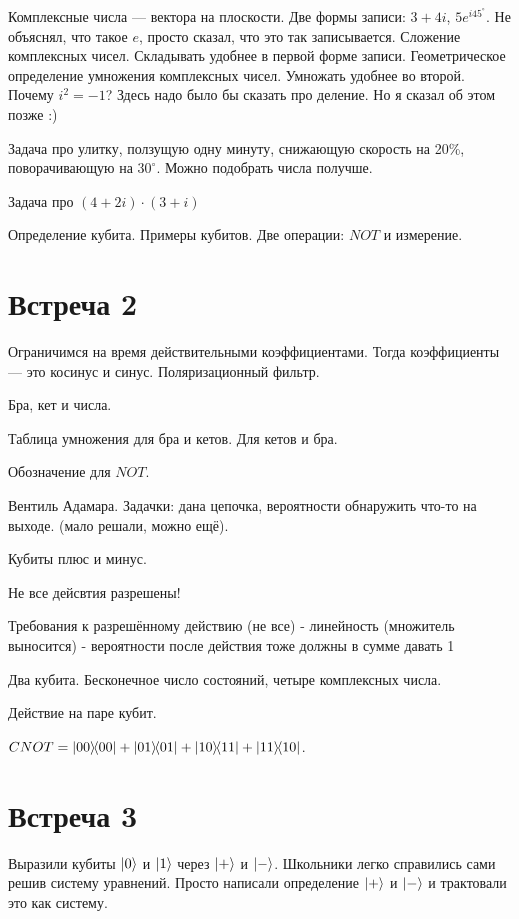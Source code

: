 \documentclass[12pt]{article}
\theoremstyle{definition}
\begin{document}
Комплексные числа — вектора на плоскости. Две формы записи: $3+4i$, $5e^{i45^{\circ}}$.
Не объяснял, что такое $e$, просто сказал, что это так записывается.
Сложение комплексных чисел. Складывать удобнее в первой форме записи. Геометрическое определение
умножения комплексных чисел. Умножать удобнее во второй. Почему $i^2=-1$?
Здесь надо было бы сказать про деление. Но я сказал об этом позже :)

Задача про улитку, ползущую одну минуту, снижающую скорость на 20\%, поворачивающую
на $30^{\circ}$. Можно подобрать числа получше.

Задача про $(4+2i)\cdot (3+i)$

Определение кубита. Примеры кубитов. Две операции: $NOT$ и измерение.

\section{Встреча 2}

Ограничимся на время действительными коэффициентами.
Тогда коэффициенты — это косинус и синус.
Поляризационный фильтр.

Бра, кет и числа.

Таблица умножения для бра и кетов. Для кетов и бра.

Обозначение для $NOT$.

Вентиль Адамара.
Задачки: дана цепочка, вероятности обнаружить что-то на выходе. (мало решали, можно ещё).


Кубиты плюс и минус.



Не все дейсвтия разрешены!

Требования к разрешённому действию (не все)
- линейность (множитель выносится)
- вероятности после действия тоже должны в сумме давать 1


Два кубита. Бесконечное число состояний, четыре комплексных числа.


Действие на паре кубит.

$CNOT = \ketbra{00}{00} + \ketbra{01}{01} + \ketbra{10}{11} + \ketbra{11}{10}$.

\section{Встреча 3}


Выразили кубиты $\ket 0$ и $\ket 1$ через $\ket +$ и $\ket -$. Школьники легко
справились сами решив систему уравнений. Просто написали определение $\ket +$
и $\ket -$ и трактовали это как систему.
\end{document}
